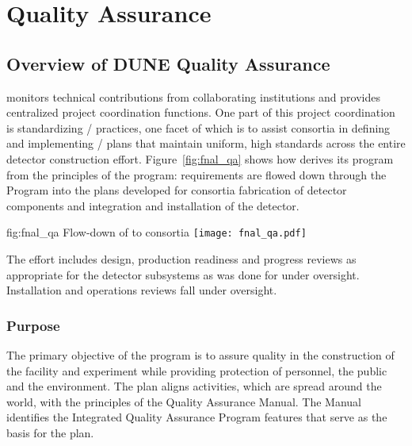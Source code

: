 \chapter{Quality Assurance}
\label{vl:tc-QA}

\section{Overview of DUNE Quality Assurance}

  monitors technical contributions from
collaborating institutions and provides centralized project
coordination functions. One part of this project coordination is
standardizing / practices, one facet
of which is to assist consortia in defining and implementing
/ plans that maintain uniform, high
standards across the entire detector construction
effort. Figure~\ref{fig:fnal_qa} shows how  
derives its  program from the principles of the \fnal {} program:
requirements are flowed down through the 
 Program into the  plans developed for consortia fabrication of
detector components and integration and installation of the detector.
\begin{dunefigure}[\fnal QA]{fig:fnal_qa}
  {Flow-down of \fnal {} to consortia}
  \texttt{[image: fnal\_qa.pdf]}
\end{dunefigure}
The  effort includes design, production readiness and
progress reviews as appropriate for the  detector
subsystems as was done for  under 
oversight. Installation and operations reviews fall under 
oversight.

\subsection{Purpose}

The primary objective of the   program is
to assure quality in the construction of the  facility and
 experiment while providing protection of
 personnel, the public and the environment. The
 plan aligns   activities, which
are spread around the world, with the principles of the \fnal Quality
Assurance Manual. The Manual identifies the \fnal Integrated Quality
Assurance Program features that serve as the basis for the
  plan.

